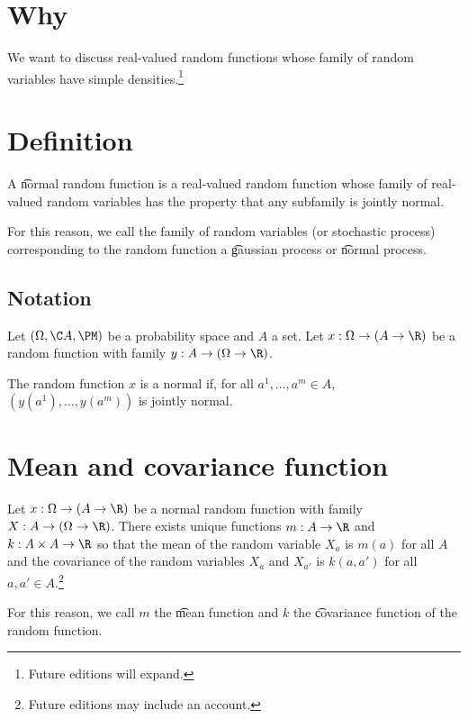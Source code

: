 

\section*{Why}

We want to discuss real-valued random functions whose family of random variables have simple densities.\footnote{Future editions will expand.}

\section*{Definition}

A \t{normal random function} is a real-valued random function whose family of real-valued random variables has the property that any subfamily is jointly normal.

For this reason, we call the family of random variables (or stochastic process) corresponding to the random function a \t{gaussian process} or \t{normal process}.

  \subsection*{Notation}

Let $(\Omega , \C A, \PM)$ be a probability space and $A$ a set.
Let $x: \Omega  \to (A \to \R )$ be a random function with family $y: A \to (\Omega  \to \R )$.

The random function $x$ is a normal if, for all $a^1, \dots , a^m \in A$, $(y(a^1), \dots , y(a^m))$ is jointly normal.

  \section*{Mean and covariance function}

\begin{proposition}
Let $x: \Omega  \to (A \to \R )$ be a normal random function with family $X: A \to (\Omega  \to \R )$.
There exists unique functions $m: A \to \R $ and $k: A \times A \to \R $ so that the mean of the random variable $X_a$ is $m(a)$ for all $A$ and the covariance of the random variables $X_a$ and $X_{a'}$ is $k(a, a')$ for all $a, a' \in A$.\footnote{Future editions may include an account.}\end{proposition}
For this reason, we call $m$ the \t{mean function} and $k$ the \t{covariance function} of the random function.

